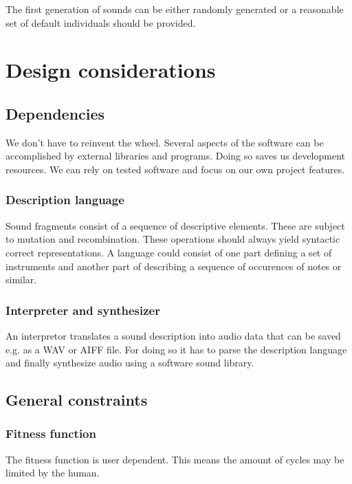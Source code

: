\documentclass[a4paper,12pt,oneside]{article}
\begin{document}
The first generation of sounds can be either randomly generated or a
reasonable set of default individuals should be provided.

\section{Design considerations}

\subsection{Dependencies}

We don't have to reinvent the wheel. Several aspects of the software
can be accomplished by external libraries and programs. Doing so saves
us development resources. We can rely on tested software and focus on
our own project features.

\subsubsection*{Description language}

Sound fragments consist of a sequence of descriptive elements. These
are subject to mutation and recombination. These operations should
always yield syntactic correct representations. A language could
consist of one part defining a set of instruments and another part of
describing a sequence of occurences of notes or similar.

\subsubsection*{Interpreter and synthesizer}

An interpretor translates a sound description into audio data that can
be saved e.g. as a WAV or AIFF file. For doing so it has to parse the
description language and finally synthesize audio using a software
sound library.

\subsection{General constraints}

\subsubsection*{Fitness function}

The fitness function is user dependent. This means the amount of
cycles may be limited by the human.
\end{document}
